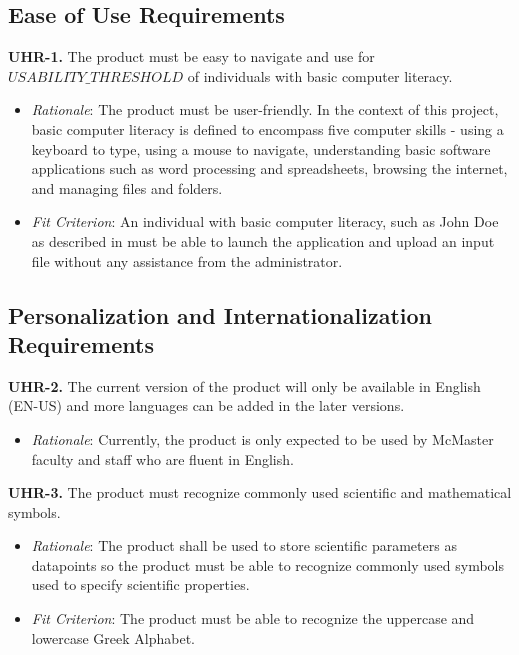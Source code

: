 \documentclass[12pt]{article}
\begin{document}
\subsection{Ease of Use Requirements}
\textbf{UHR-1.} The product must be easy to navigate and use for \\ $USABILITY\_THRESHOLD$ of individuals with basic computer literacy.
\begin{itemize}
  \item \emph{Rationale}: The product must be user-friendly. In the context of this project, basic computer literacy is defined to encompass five computer skills - using a keyboard
  to type, using a mouse to navigate, understanding basic software applications such as word processing and spreadsheets, browsing the internet, and managing files and folders.
  \item \emph{Fit Criterion}: An individual with basic computer literacy, such as John Doe as described in  must be able to launch the application and upload an input file
  without any assistance from the administrator.
\end{itemize}

\subsection{Personalization and Internationalization Requirements}
\textbf{UHR-2.} The current version of the product will only be available in English (EN-US) and more languages can be added in the later versions.
\begin{itemize}
  \item \emph{Rationale}: Currently, the product is only expected to be used by McMaster faculty and staff who are fluent in English.
\end{itemize}
\bigskip
\textbf{UHR-3.} The product must recognize commonly used scientific and mathematical symbols.
\begin{itemize}
  \item \emph{Rationale}: The product shall be used to store scientific parameters as datapoints so the product must be able to recognize commonly used symbols used to specify scientific properties.
  \item \emph{Fit Criterion}: The product must be able to recognize the uppercase and lowercase Greek Alphabet.
\end{itemize}
\end{document}
